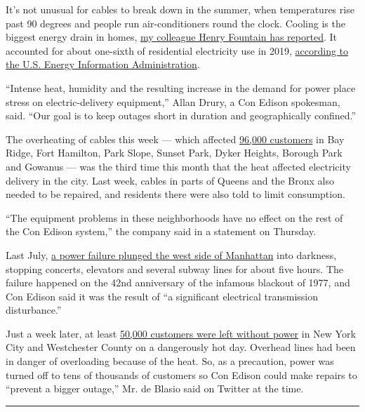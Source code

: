 It's not unusual for cables to break down in the summer, when
temperatures rise past 90 degrees and people run air-conditioners round
the clock. Cooling is the biggest energy drain in homes,
\href{https://www.nytimes.com/2020/04/29/climate/nyt-climate-newsletter-energy-bill.html}{my
colleague Henry Fountain has reported}. It accounted for about one-sixth
of residential electricity use in 2019,
\href{https://www.eia.gov/tools/faqs/faq.php?id=96\&t=3}{according to
the U.S. Energy Information Administration}.

``Intense heat, humidity and the resulting increase in the demand for
power place stress on electric-delivery equipment,'' Allan Drury, a Con
Edison spokesman, said. ``Our goal is to keep outages short in duration
and geographically confined.''

The overheating of cables this week --- which affected
\href{https://www.coned.com/en/about-us/media-center/news/20200730/con-edison-asks-customers-in-area-of-brooklyn-to-conserve-energy}{96,000
customers} in Bay Ridge, Fort Hamilton, Park Slope, Sunset Park, Dyker
Heights, Borough Park and Gowanus --- was the third time this month that
the heat affected electricity delivery in the city. Last week, cables in
parts of Queens and the Bronx also needed to be repaired, and residents
there were also told to limit consumption.

``The equipment problems in these neighborhoods have no effect on the
rest of the Con Edison system,'' the company said in a statement on
Thursday.

Last July,
\href{https://www.nytimes.com/2019/07/13/nyregion/nyc-power-outage.html}{a
power failure plunged the west side of Manhattan} into darkness,
stopping concerts, elevators and several subway lines for about five
hours. The failure happened on the 42nd anniversary of the infamous
blackout of 1977, and Con Edison said it was the result of ``a
significant electrical transmission disturbance.''

Just a week later, at least
\href{https://www.nytimes.com/2019/07/21/nyregion/nyc-heat-wave.html}{50,000
customers were left without power} in New York City and Westchester
County on a dangerously hot day. Overhead lines had been in danger of
overloading because of the heat. So, as a precaution, power was turned
off to tens of thousands of customers so Con Edison could make repairs
to ``prevent a bigger outage,'' Mr. de Blasio said on Twitter at the
time.

\begin{center}\rule{0.5\linewidth}{\linethickness}\end{center}

